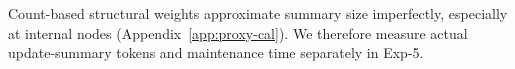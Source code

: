  Count-based structural weights
approximate summary size imperfectly, especially at internal nodes
(Appendix~\ref{app:proxy-cal}). We therefore measure actual update-summary
tokens and maintenance time separately in Exp-5.




